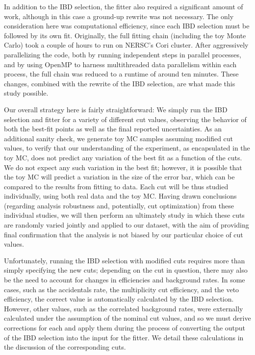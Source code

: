 \documentclass[../thesis.tex]{subfiles}
\begin{document}
In addition to the IBD selection, the fitter also required a significant amount of work, although in this case a ground-up rewrite was not necessary. The only consideration here was computational efficiency, since each IBD selection must be followed by its own fit. Originally, the full fitting chain (including the toy Monte Carlo) took a couple of hours to run on NERSC's Cori cluster. After aggressively parallelizing the code, both by running independent steps in parallel processes, and by using OpenMP to harness multithreaded data parallelism within each process, the full chain was reduced to a runtime of around ten minutes. These changes, combined with the rewrite of the IBD selection, are what made this study possible.

Our overall strategy here is fairly straightforward: We simply run the IBD selection and fitter for a variety of different cut values, observing the behavior of both the best-fit points as well as the final reported uncertainties. As an additional sanity check, we generate toy MC samples assuming modified cut values, to verify that our understanding of the experiment, as encapsulated in the toy MC, does not predict any variation of the best fit as a function of the cuts. We do not expect any such variation in the best fit; however, it is possible that the toy MC will predict a variation in the size of the error bar, which can be compared to the results from fitting to data. Each cut will be thus studied individually, using both real data and the toy MC\@. Having drawn conclusions (regarding analysis robustness and, potentially, cut optimization) from these individual studies, we will then perform an ultimately study in which these cuts are randomly varied jointly and applied to our dataset, with the aim of providing final confirmation that the analysis is not biased by our particular choice of cut values.

Unfortunately, running the IBD selection with modified cuts requires more than simply specifying the new cuts; depending on the cut in question, there may also be the need to account for changes in efficiencies and background rates. In some cases, such as the accidentals rate, the multiplicity cut efficiency, and the veto efficiency, the correct value is automatically calculated by the IBD selection. However, other values, such as the correlated background rates, were externally calculated under the assumption of the nominal cut values, and so we must derive corrections for each and apply them during the process of converting the output of the IBD selection into the input for the fitter. We detail these calculations in the discussion of the corresponding cuts.
\end{document}
